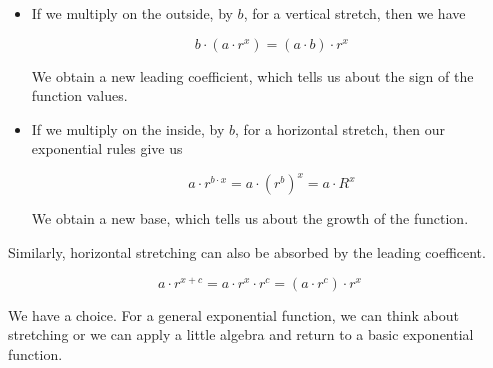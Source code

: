 \documentclass{ximera}
\begin{document}
\begin{itemize}
\item If we multiply on the outside, by $b$, for a vertical stretch, then we have

\[
b \cdot (a \cdot r^x) = (a \cdot b) \cdot r^x
\]

We obtain a new leading coefficient, which tells us about the sign of the function values. \\






\item If we multiply on the inside, by $b$, for a horizontal stretch, then our exponential rules give us

\[
a \cdot r^{b \cdot x} = a \cdot (r^b)^x = a \cdot R^x
\]

We obtain a new base, which tells us about the growth of the function.


\end{itemize}





Similarly, horizontal stretching can also be absorbed by the leading coefficent.

 \[
 a \cdot r^{x+c} = a \cdot r^x \cdot r^c = (a \cdot r^c) \cdot r^x
\]




We have a choice.  For a general exponential function, we can think about stretching or we can apply a little algebra and return to a basic exponential function.
\end{document}
